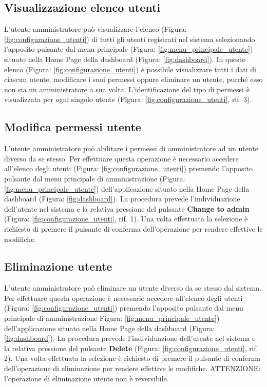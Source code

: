 	\pagebreak
	\subsection{Visualizzazione elenco utenti}
		L'utente amministratore può visualizzare l'elenco (Figura: \ref{fig:configurazione_utenti}) di tutti gli utenti registrati nel sistema selezionando l'apposito pulsante dal menu principale (Figura: \ref{fig:menu_principale_utente}) situato nella Home Page della dashboard\gloss{} (Figura: \ref{fig:dashboard}).\newline
		In questo elenco (Figura: \ref{fig:configurazione_utenti}) è possibile visualizzare tutti i dati di ciascun utente, modificare  i suoi permessi oppure eliminare un utente, purché esso non sia un amministratore a sua volta.\newline
		L'identificazione del tipo di permessi è visualizzata per ogni singolo utente (Figura: \ref{fig:configurazione_utenti}, rif. 3).

	
	\subsection{Modifica permessi utente}
		L'utente amministratore può abilitare i permessi di amministratore ad un utente diverso da se stesso.\newline
		Per effettuare questa operazione è necessario accedere all'elenco degli utenti (Figura: \ref{fig:configurazione_utenti}) premendo l'apposito pulsante dal menu principale di amministrazione (Figura: \ref{fig:menu_principale_utente}) dell'applicazione situato nella Home Page della dashboard (Figura: \ref{fig:dashboard}).
		La procedura prevede l'individuazione dell'utente nel sistema e la relativa pressione del pulsante \textbf{Change to admin} (Figura: \ref{fig:configurazione_utenti}, rif. 1).\newline
		Una volta effettuata la selezione è richiesto di premere il pulsante di conferma dell'operazione per rendere effettive le modifiche.

	
	\subsection{Eliminazione utente}
		L'utente amministratore può eliminare un utente diverso da se stesso dal sistema.\newline
		Per effettuare questa operazione è necessario accedere all'elenco degli utenti (Figura: \ref{fig:configurazione_utenti}) premendo l'apposito pulsante dal menu principale di amministrazione Figura: \ref{fig:menu_principale_utente}) dell'applicazione situato nella Home Page della dashboard (Figura: \ref{fig:dashboard}).
		La procedura prevede l'individuazione dell'utente nel sistema e la relativa pressione del pulsante \textbf{Delete} (Figura: \ref{fig:configurazione_utenti}, rif. 2).\newline
		Una volta effettuata la selezione è richiesto di premere il pulsante di conferma dell'operazione di eliminazione per rendere effettive le modifiche.\newline
		ATTENZIONE: l'operazione di eliminazione utente non è reversibile.
		

